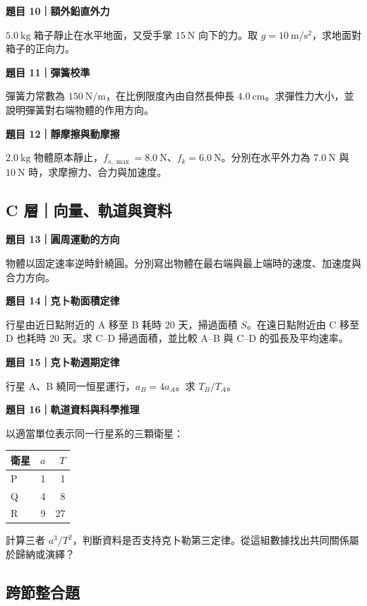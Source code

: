 \documentclass[11pt,a4paper]{article}
\newcounter{none}
\begin{document}
\textbf{題目 10｜額外鉛直外力}

\(5.0\ \mathrm{kg}\) 箱子靜止在水平地面，又受手掌 \(15\ \mathrm N\) 向下的力。取 \(g=10\ \mathrm{m/s^2}\)，求地面對箱子的正向力。

\textbf{題目 11｜彈簧校準}

彈簧力常數為 \(150\ \mathrm{N/m}\)，在比例限度內由自然長伸長 \(4.0\ \mathrm{cm}\)。求彈性力大小，並說明彈簧對右端物體的作用方向。

\textbf{題目 12｜靜摩擦與動摩擦}

\(2.0\ \mathrm{kg}\) 物體原本靜止，\(f_{s,\max}=8.0\ \mathrm N\)、\(f_k=6.0\ \mathrm N\)。分別在水平外力為 \(7.0\ \mathrm N\) 與 \(10\ \mathrm N\) 時，求摩擦力、合力與加速度。

\subsection{C 層｜向量、軌道與資料}\label{c-ux5c64ux5411ux91cfux8eccux9053ux8207ux8cc7ux6599}

\textbf{題目 13｜圓周運動的方向}

物體以固定速率逆時針繞圓。分別寫出物體在最右端與最上端時的速度、加速度與合力方向。

\textbf{題目 14｜克卜勒面積定律}

行星由近日點附近的 A 移至 B 耗時 \(20\) 天，掃過面積 \(S\)。在遠日點附近由 C 移至 D 也耗時 \(20\) 天。求 C--D 掃過面積，並比較 A--B 與 C--D 的弧長及平均速率。

\textbf{題目 15｜克卜勒週期定律}

行星 A、B 繞同一恒星運行，\(a_B=4a_A\)。求 \(T_B/T_A\)。

\textbf{題目 16｜軌道資料與科學推理}

以適當單位表示同一行星系的三顆衛星：

{\def\LTcaptype{none} %
\begin{longtable}[]{@{}lrr@{}}
\toprule\noalign{}
衛星 & \(a\) & \(T\) \\
\midrule\noalign{}
\endhead
\bottomrule\noalign{}
\endlastfoot
P & 1 & 1 \\
Q & 4 & 8 \\
R & 9 & 27 \\
\end{longtable}
}

計算三者 \(a^3/T^2\)，判斷資料是否支持克卜勒第三定律。從這組數據找出共同關係屬於歸納或演繹？

\subsection{跨節整合題}\label{ux8de8ux7bc0ux6574ux5408ux984c}
\end{document}
